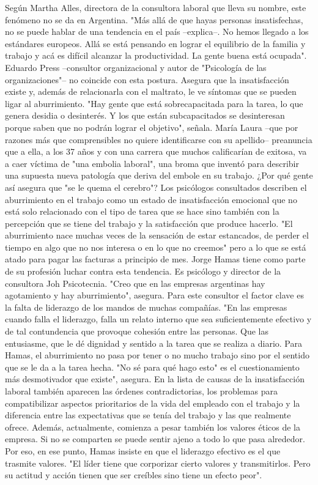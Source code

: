 Según Martha Alles, directora de la consultora laboral que lleva su nombre, este fenómeno no se da en Argentina. "Más allá de que hayas personas insatisfechas, no se puede hablar de una tendencia en el país –explica–. No hemos llegado a los estándares europeos. Allá se está pensando en lograr el equilibrio de la familia y trabajo y acá es difícil alcanzar la productividad. La gente buena está ocupada". Eduardo Press –consultor organizacional y autor de "Psicología de las organizaciones"– no coincide con esta postura. Asegura que la insatisfacción existe y, además de relacionarla con el maltrato, le ve síntomas que se pueden ligar al aburrimiento. "Hay gente que está sobrecapacitada para la tarea, lo que genera desidia o desinterés. Y los que están subcapacitados se desinteresan porque saben que no podrán lograr el objetivo", señala. María Laura –que por razones más que comprensibles no quiere identificarse con su apellido– preanuncia que a ella, a los 37 años y con una carrera que muchos calificarían de exitosa, va a caer víctima de "una embolia laboral", una broma que inventó para describir una supuesta nueva patología que deriva del embole en su trabajo. ¿Por qué gente así asegura que "se le quema el cerebro"? Los psicólogos consultados describen el aburrimiento en el trabajo como un estado de insatisfacción emocional que no está solo relacionado con el tipo de tarea que se hace sino también con la percepción que se tiene del trabajo y la satisfacción que produce hacerlo. "El aburrimiento nace muchas veces de la sensación de estar estancados, de perder el tiempo en algo que no nos interesa o en lo que no creemos" pero a lo que se está atado para pagar las facturas a principio de mes. Jorge Hamas tiene como parte de su profesión luchar contra esta tendencia. Es psicólogo y director de la consultora Joh Psicotecnia. "Creo que en las empresas argentinas hay agotamiento y hay aburrimiento", asegura. Para este consultor el factor clave es la falta de liderazgo de los mandos de muchas compañías. "En las empresas cuando falla el liderazgo, falla un relato interno que sea suficientemente efectivo y de tal contundencia que provoque cohesión entre las personas. Que las entusiasme, que le dé dignidad y sentido a la tarea que se realiza a diario. Para Hamas, el aburrimiento no pasa por tener o no mucho trabajo sino por el sentido que se le da a la tarea hecha. "No sé para qué hago esto" es el cuestionamiento más desmotivador que existe", asegura. En la lista de causas de la insatisfacción laboral también aparecen las órdenes contradictorias, los problemas para compatibilizar aspectos prioritarios de la vida del empleado con el trabajo y la diferencia entre las expectativas que se tenía del trabajo y las que realmente ofrece. Además, actualmente, comienza a pesar también los valores éticos de la empresa. Si no se comparten se puede sentir ajeno a todo lo que pasa alrededor. Por eso, en ese punto, Hamas insiste en que el liderazgo efectivo es el que trasmite valores. "El líder tiene que corporizar cierto valores y transmitirlos. Pero su actitud y acción tienen que ser creíbles sino tiene un efecto peor".

